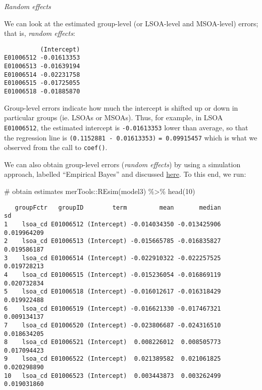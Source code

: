\documentclass[
  letterpaper,
  krantz2]{style/krantz}
\newenvironment{Shaded}{\begin{snugshade}}{\end{snugshade}}
\newcommand{\CommentTok}[1]{\textcolor[rgb]{0.37,0.37,0.37}{#1}}
\newcommand{\DecValTok}[1]{\textcolor[rgb]{0.68,0.00,0.00}{#1}}
\newcommand{\FunctionTok}[1]{\textcolor[rgb]{0.28,0.35,0.67}{#1}}
\newcommand{\NormalTok}[1]{\textcolor[rgb]{0.00,0.23,0.31}{#1}}
\newcommand{\OtherTok}[1]{\textcolor[rgb]{0.00,0.23,0.31}{#1}}
\newcommand{\SpecialCharTok}[1]{\textcolor[rgb]{0.37,0.37,0.37}{#1}}
\begin{document}
\emph{Random effects}

We can look at the estimated group-level (or LSOA-level and MSOA-level)
errors; that is, \emph{random effects}:

\begin{Shaded}
\end{Shaded}

\begin{verbatim}
          (Intercept)
E01006512 -0.01613353
E01006513 -0.01639194
E01006514 -0.02231758
E01006515 -0.01725055
E01006518 -0.01885870
\end{verbatim}

Group-level errors indicate how much the intercept is shifted up or down
in particular groups (ie. LSOAs or MSOAs). Thus, for example, in LSOA
\texttt{E01006512}, the estimated intercept is \texttt{-0.01613353}
lower than average, so that the regression line is
\texttt{(0.1152881\ -\ 0.01613353)} \texttt{=\ 0.09915457} which is what
we observed from the call to \texttt{coef()}.

We can also obtain group-level errors (\emph{random effects}) by using a
simulation approach, labelled ``Empirical Bayes'' and discussed
\href{https://stat.ethz.ch/pipermail/r-sig-mixed-models/2009q4/002984.html}{here}.
To this end, we run:

\begin{Shaded}
\begin{Highlighting}[]
\CommentTok{\# obtain estimates}
\NormalTok{merTools}\SpecialCharTok{::}\FunctionTok{REsim}\NormalTok{(model3) }\SpecialCharTok{\%\textgreater{}\%} \FunctionTok{head}\NormalTok{(}\DecValTok{10}\NormalTok{)}
\end{Highlighting}
\end{Shaded}

\begin{verbatim}
   groupFctr   groupID        term         mean       median          sd
1    lsoa_cd E01006512 (Intercept) -0.014034350 -0.013425906 0.019964209
2    lsoa_cd E01006513 (Intercept) -0.015665785 -0.016835827 0.019586187
3    lsoa_cd E01006514 (Intercept) -0.022910322 -0.022257525 0.019728213
4    lsoa_cd E01006515 (Intercept) -0.015236054 -0.016869119 0.020732834
5    lsoa_cd E01006518 (Intercept) -0.016012617 -0.016318429 0.019922488
6    lsoa_cd E01006519 (Intercept) -0.016621330 -0.017467321 0.009134137
7    lsoa_cd E01006520 (Intercept) -0.023806687 -0.024316510 0.018634205
8    lsoa_cd E01006521 (Intercept)  0.008226012  0.008505773 0.017094423
9    lsoa_cd E01006522 (Intercept)  0.021389582  0.021061825 0.020298890
10   lsoa_cd E01006523 (Intercept)  0.003443873  0.003262499 0.019031860
\end{verbatim}
\end{document}
